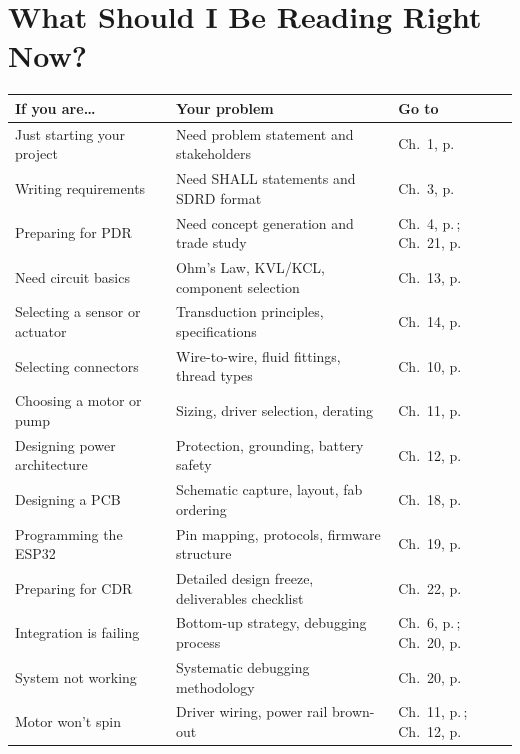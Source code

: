 \documentclass[11pt,letterpaper,twoside,openany]{book}
\begin{document}
\chapter*{What Should I Be Reading Right Now?}

\begin{center}\small
\begin{tabularx}{\textwidth}{l X l}
\toprule
\textbf{If you are\ldots} & \textbf{Your problem} & \textbf{Go to} \\
\midrule
Just starting your project & Need problem statement and stakeholders & Ch.~1, p.\,\pageref{ch:problem} \\
Writing requirements & Need SHALL statements and SDRD format & Ch.~3, p.\,\pageref{ch:requirements} \\
Preparing for PDR & Need concept generation and trade study & Ch.~4, p.\,\pageref{ch:concept}; Ch.~21, p.\,\pageref{ch:pdr} \\
Need circuit basics & Ohm's Law, KVL/KCL, component selection & Ch.~13, p.\,\pageref{ch:electronics} \\
Selecting a sensor or actuator & Transduction principles, specifications & Ch.~14, p.\,\pageref{ch:sensors} \\
Selecting connectors & Wire-to-wire, fluid fittings, thread types & Ch.~10, p.\,\pageref{ch:connectors} \\
Choosing a motor or pump & Sizing, driver selection, derating & Ch.~11, p.\,\pageref{ch:motors} \\
Designing power architecture & Protection, grounding, battery safety & Ch.~12, p.\,\pageref{ch:power} \\
Designing a PCB & Schematic capture, layout, fab ordering & Ch.~18, p.\,\pageref{ch:pcb} \\
Programming the ESP32 & Pin mapping, protocols, firmware structure & Ch.~19, p.\,\pageref{ch:mcu} \\
Preparing for CDR & Detailed design freeze, deliverables checklist & Ch.~22, p.\,\pageref{ch:cdr} \\
Integration is failing & Bottom-up strategy, debugging process & Ch.~6, p.\,\pageref{ch:integration}; Ch.~20, p.\,\pageref{ch:debug} \\
System not working & Systematic debugging methodology & Ch.~20, p.\,\pageref{ch:debug} \\
Motor won't spin & Driver wiring, power rail brown-out & Ch.~11, p.\,\pageref{ch:motors}; Ch.~12, p.\,\pageref{ch:power} \\

\end{tabularx}
\end{center}
\end{document}
